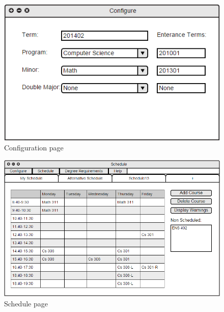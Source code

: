 \documentclass[twoside,letterpaper]{article}
\begin{document}
\begin{figure}[h!]
\centering
\includegraphics[keepaspectratio, scale=0.6]{Mockups/config.png}
\caption{Configuration page}
\label{fig:mockupConfig}
\end{figure}

\begin{figure}[h!]
\centering
\includegraphics[keepaspectratio, scale=0.6]{Mockups/schedule.png}
\caption{Schedule page}
\label{fig:mockupSchedule}
\end{figure}
\end{document}

